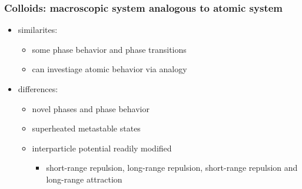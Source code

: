 \documentclass[11pt]{article}
\begin{document}
\subsubsection{Colloids: macroscopic system analogous to atomic system}
\label{sec-3-1-1}
\begin{itemize}

\item similarites:
\label{sec-3-1-1-1}%
\begin{itemize}

\item some phase behavior and phase transitions\\
\label{sec-3-1-1-1-1}%
\item can investiage atomic behavior via analogy\\
\label{sec-3-1-1-1-2}%
\end{itemize} %

\item differences:
\label{sec-3-1-1-2}%
\begin{itemize}

\item novel phases and phase behavior\\
\label{sec-3-1-1-2-1}%
\item superheated metastable states\\
\label{sec-3-1-1-2-2}%
\item interparticle potential readily modified
\label{sec-3-1-1-2-3}%
\begin{itemize}

\item short-range repulsion, long-range repulsion, short-range repulsion and long-range attraction\\
\label{sec-3-1-1-2-3-1}%
\end{itemize} %
\end{itemize} %
\end{itemize} %
\end{document}
